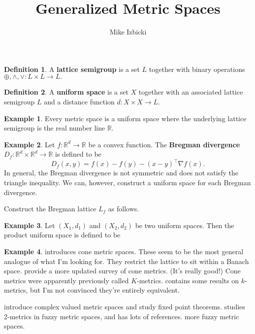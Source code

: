\documentclass{article}
\title{Generalized Metric Spaces}
\author{Mike Izbicki}
\theoremstyle{definition}
\newtheorem{definition}{Definition}
\newtheorem{example}{Example}
\newcommand{\defn}[1]{\textbf{#1}}
\newcommand{\grad}{\nabla\!}
\newcommand{\R}{\mathbb{R}}
\newcommand{\trans}[1]{{#1}^{\top}}
\newcommand{\+}{\oplus}
\newcommand{\meet}{\wedge}
\newcommand{\join}{\vee}
\newcommand{\dist}{d}
\newcommand{\breg}{D}
\begin{document}
\maketitle



\newpage

\begin{definition}
    A \defn{lattice semigroup} is a set $L$ together with binary operations $\+,\meet,\join : L\times L\to L.$
\end{definition}

\begin{definition}
    A \defn{uniform space} is a set $X$ together with an associated lattice semigroup $L$ and a distance function $\dist : X\times X\to L$.
\end{definition}

\begin{example}
    Every metric space is a uniform space where the underlying lattice semigroup is the real number line $\R$.
\end{example}

\begin{example}
    Let $f : \R^d \to \R$ be a convex function.
    The \defn{Bregman divergence} $\breg_f : \R^d\times\R^d\to\R$ is defined to be
    \begin{equation}
        \breg_f(x,y) = f(x)-f(y) - \trans{(x-y)}\grad f(x)
        .
    \end{equation}
    In general, the Bregman divergence is not symmetric and does not satisfy the triangle inequality.
    We can, however, construct a uniform space for each Bregman divergence.

    Construct the Bregman lattice $L_f$ as follows.
\end{example}

\begin{example}
    Let $(X_1,\dist_1)$ and $(X_2,\dist_2)$ be two uniform spaces.
    Then the product uniform space is defined to be
\end{example}

\begin{example}
    \citet{huang2007cone} introduces cone metric spaces.
    These seem to be the most general analogue of what I'm looking for.
    They restrict the lattice to sit within a Banach space.
    \citet{jankovic2011cone} provide a more updated survey of cone metrics.
    (It's really good!)
    Cone metrics were apparently previously called $K$-metrics.
    \citet{pajoohesh2013kmetric} contains some results on $k$-metrics, 
    but I'm not convinced they're entirely equivalent.

    \citet{azam2011common} introduce complex valued metric spaces and study fixed point theorems.
    \citet{paul2016extensions} studies 2-metrics in fuzzy metric spaces, and has lots of references.
    \citet{george1994some} more fuzzy metric spaces.
\end{example}
\end{document}
